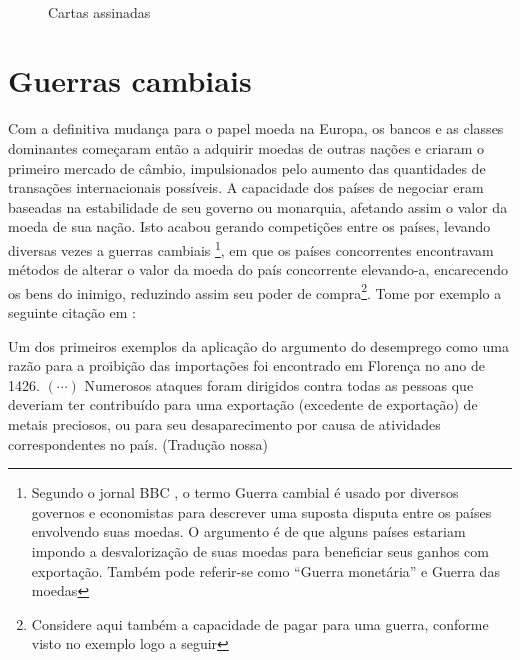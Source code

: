 \begin{figure}[H]\label{card}
		\caption{Cartas assinadas}%
		\quad
		\begin{center}
			\\
		\end{center}
\end{figure}

\section{Guerras cambiais}
Com a definitiva mudança para o papel moeda na Europa, os bancos e as classes dominantes começaram então a adquirir moedas de outras nações e criaram o primeiro mercado de câmbio, impulsionados pelo aumento das quantidades de transações internacionais possíveis. A capacidade dos países de negociar eram baseadas na estabilidade de seu governo ou monarquia, afetando assim o valor da moeda de sua nação. Isto acabou gerando competições entre os países, levando diversas vezes a guerras cambiais \footnote{Segundo o jornal BBC \cite{BBC1}, o termo Guerra cambial é usado por diversos governos e economistas para descrever uma suposta disputa entre os países envolvendo suas moedas. O argumento é de que alguns países estariam impondo a desvalorização de suas moedas para beneficiar seus ganhos com exportação. Também pode referir-se como ``Guerra monetária'' e Guerra das moedas}, em que os países concorrentes encontravam métodos de alterar o valor da moeda do país concorrente elevando-a, encarecendo os bens do inimigo, reduzindo assim seu poder de compra\footnote{Considere aqui também a capacidade de pagar para uma guerra, conforme visto no exemplo logo a seguir}. Tome por exemplo a seguinte citação em \cite{KEYNES}:

\begin{citacao}
	Um dos primeiros exemplos da aplicação do argumento do desemprego como uma razão para a proibição das importações foi encontrado em Florença no ano de 1426. $(\cdots)$ Numerosos ataques foram dirigidos contra todas as pessoas que deveriam ter contribuído para uma exportação (excedente de exportação) de metais preciosos, ou para seu desaparecimento por causa de atividades correspondentes no país. (Tradução nossa)
\end{citacao}

